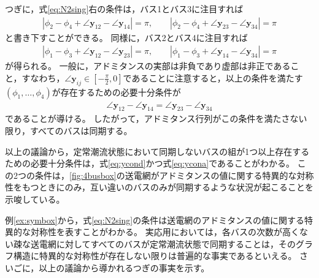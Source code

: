 \documentclass[tombow,dvipdfmx]{corona-a5}
\begin{document}
\begin{例}[4つのバスからなる円環構造の送電網におけるバスの同期]
つぎに，式\ref{eq:N2sing}右の条件は，バス1とバス3に注目すれば
\begin{align*}
|\phi_2 - \phi_4 + \angle \bm{y}_{12} - \angle \bm{y}_{14}|=\pi
,\qquad
|\phi_2 - \phi_4 + \angle \bm{y}_{23} - \angle \bm{y}_{34}|=\pi
\end{align*}
と書き下すことができる。
同様に，バス2とバス4に注目すれば
\begin{align*}
|\phi_1 - \phi_3 + \angle \bm{y}_{12} - \angle \bm{y}_{23}|=\pi
,\qquad
|\phi_1 - \phi_3 + \angle \bm{y}_{14} - \angle \bm{y}_{34}|=\pi
\end{align*}
が得られる。
一般に，アドミタンスの実部は非負であり虚部は非正であること，すなわち，$\angle \bm{y}_{ij} \in \left[-\frac{\pi}{2},0 \right]$であることに注意すると，以上の条件を満たす$(\phi_1,\ldots,\phi_4)$が存在するための必要十分条件が
\begin{align}\label{eq:ycona}
\angle \bm{y}_{12} - \angle \bm{y}_{14}=
\angle \bm{y}_{23} - \angle \bm{y}_{34}
\end{align}
であることが導ける。
したがって，アドミタンス行列がこの条件を満たさない限り，すべてのバスは同期する。

以上の議論から，定常潮流状態において同期しないバスの組が1つ以上存在するための必要十分条件は，式\ref{eq:ycond}かつ式\ref{eq:ycona}であることがわかる。
この2つの条件は，\ref{fig:4busbox}の送電網がアドミタンスの値に関する特異的な対称性をもつときにのみ，互い違いのバスのみが同期するような状況が起こることを示唆している。
\end{例}

例\ref{ex:symbox}から，式\ref{eq:N2sing}の条件は送電網のアドミタンスの値に関する特異的な対称性を表すことがわかる。
実応用においては，各バスの次数が高くない疎な送電網に対してすべてのバスが定常潮流状態で同期することは，そのグラフ構造に特異的な対称性が存在しない限りは普遍的な事実であるといえる。
さいごに，以上の議論から導かれるつぎの事実を示す。
\end{document}
